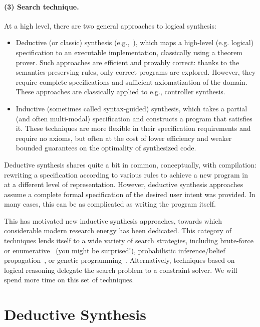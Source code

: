 \documentclass[11pt]{article}
\begin{document}
\paragraph{(3) Search technique.}
At a high level, there are two general approaches to logical synthesis:
\begin{itemize}
\item Deductive (or classic) synthesis (e.g.,~\cite{deductive}), which maps a
  high-level (e.g. logical) specification to an executable implementation,
  classically using a theorem prover. Such approaches are efficient and provably
  correct: thanks to the semantics-preserving rules, only correct programs are
  explored. However, they require complete specifications and sufficient
  axiomatization of the domain. These approaches are classically applied to
  e.g., controller synthesis.
\item Inductive (sometimes called syntax-guided) synthesis, which takes a
  partial (and often multi-modal) specification and constructs a program that
  satisfies it.  These techniques are more flexible in their specification
  requirements and require no axioms, but often at the cost of lower efficiency
  and weaker bounded guarantees on the optimality of synthesized code.  
\end{itemize}


Deductive synthesis shares quite a bit in common, conceptually, with
compilation: rewriting a specification according to various rules to achieve a
new program in at a different level of representation.  
However, deductive synthesis approaches assume a
complete formal specification of the desired user intent was provided. In many
cases, this can be as complicated as writing the program itself.

This has motivated new inductive synthesis approaches, towards which
considerable modern research energy has been dedicated. This category of
techniques lends itself to a wide variety of search strategies, including
brute-force or enumerative~\cite{AlurBDF0JKMMRSSSSTU15} (you might be
surprised!), probabilistic inference/belief propagation~\cite{Gulwani2007}, or
genetic programming~\cite{Katz2008}. Alternatively, techniques based on logical
reasoning delegate the search problem to a constraint solver. We will spend more
time on this set of techniques.

\section{Deductive Synthesis}
\end{document}
